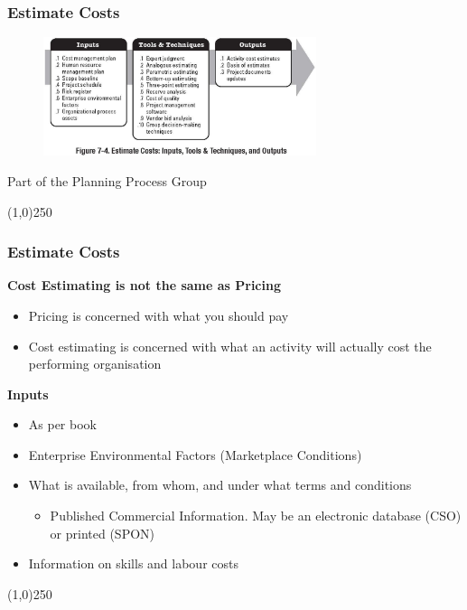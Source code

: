 \begin{frame}
\frametitle{Estimate Costs}
\begin{figure}
	\centering
		\includegraphics[width = 8cm]{images/fig7-4.jpg}
	\label{fig:7-4}
\end{figure}Part of the Planning Process Group
\end{frame}
\begin{center}\line(1,0){250}\end{center}






\begin{frame}
\frametitle{Estimate Costs}
\textbf{Cost Estimating is not the same as Pricing}\\
\begin{itemize}
	\item Pricing is concerned with what you should pay
	\item Cost estimating is concerned with what an activity will actually cost the performing organisation
\end{itemize}
\textbf{Inputs}\\
\begin{itemize}
	\item As per book
	\item Enterprise Environmental Factors (Marketplace Conditions)
	\item What is available, from whom, and under what terms and conditions
	\begin{itemize}
		\item Published Commercial Information. May be an electronic database (CSO) or printed (SPON)
	\end{itemize}
	\item Information on skills and labour costs
\end{itemize}
\end{frame}
\begin{center}\line(1,0){250}\end{center}









